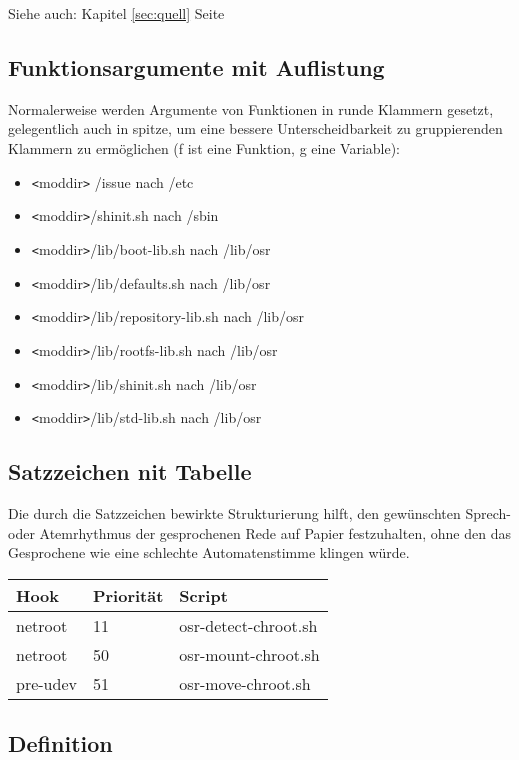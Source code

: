 \documentclass[10pt,a4paper]{article}
\begin{document}
Siehe auch: Kapitel \ref{sec:quell} Seite \pageref{sec:quell}

\subsection{Funktionsargumente mit Auflistung}

Normalerweise werden Argumente von Funktionen in runde Klammern gesetzt,
gelegentlich auch in spitze, um eine bessere Unterscheidbarkeit zu
gruppierenden Klammern zu ermöglichen (f ist eine Funktion, g eine Variable):

\begin{itemize}
 \item \verb|<|moddir\verb|>| /issue nach /etc
 \item \verb|<|moddir\verb|>|/shinit.sh nach /sbin
 \item \verb|<|moddir\verb|>|/lib/boot-lib.sh nach /lib/osr
 \item \verb|<|moddir\verb|>|/lib/defaults.sh nach /lib/osr
 \item \verb|<|moddir\verb|>|/lib/repository-lib.sh nach /lib/osr
 \item \verb|<|moddir\verb|>|/lib/rootfs-lib.sh nach /lib/osr
 \item \verb|<|moddir\verb|>|/lib/shinit.sh nach /lib/osr
 \item \verb|<|moddir\verb|>|/lib/std-lib.sh nach /lib/osr
\end{itemize}

\subsection{Satzzeichen nit Tabelle}

Die durch die Satzzeichen bewirkte Strukturierung hilft, den gewünschten
Sprech- oder Atemrhythmus der gesprochenen Rede auf Papier festzuhalten,
ohne den das Gesprochene wie eine schlechte Automatenstimme klingen würde.

\begin{tabular}{|l|l|l|}
 \hline
\textbf{Hook} & \textbf{Priorität} & \textbf{Script} \\ \hline
netroot  & 11 & osr-detect-chroot.sh \\ \hline
netroot  & 50 & osr-mount-chroot.sh \\ \hline
pre-udev & 51 & osr-move-chroot.sh \\ \hline
\end{tabular}

\subsection{Definition}
\end{document}
